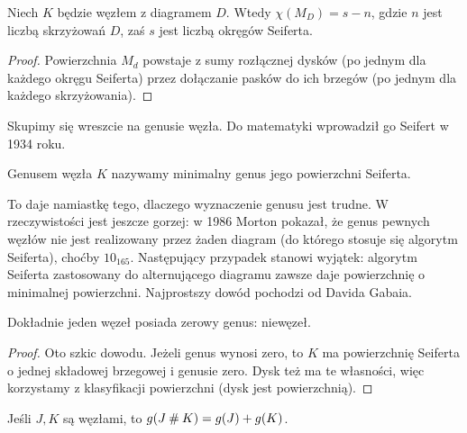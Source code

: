 
\begin{proposition}
    Niech $K$ będzie węzłem z diagramem $D$. Wtedy $\chi(M_D) = s - n$, gdzie $n$ jest liczbą skrzyżowań $D$, zaś $s$ jest liczbą okręgów Seiferta.
\end{proposition}

\begin{proof}
Powierzchnia $M_d$ powstaje z sumy rozłącznej dysków (po jednym dla każdego okręgu Seiferta) przez dołączanie pasków do ich brzegów (po jednym dla każdego skrzyżowania).
\end{proof}

Skupimy się wreszcie na genusie węzła.
Do matematyki wprowadził go Seifert w 1934 roku.

\begin{definition}
    Genusem węzła $K$ nazywamy minimalny genus jego powierzchni Seiferta.
\end{definition}

To daje namiastkę tego, dlaczego wyznaczenie genusu jest trudne.
W rzeczywistości jest jeszcze gorzej: w 1986 Morton pokazał, że genus pewnych węzłów nie jest realizowany przez żaden diagram (do którego stosuje się algorytm Seiferta), choćby $10_{165}$.
Następujący przypadek stanowi wyjątek: algorytm Seiferta zastosowany do alternującego diagramu zawsze daje powierzchnię o minimalnej powierzchni.
Najprostszy dowód pochodzi od Davida Gabaia.

\begin{proposition} \label{genus_one}
    Dokładnie jeden węzeł posiada zerowy genus: niewęzeł.
\end{proposition}

\begin{proof}Oto szkic dowodu.
Jeżeli genus wynosi zero, to $K$ ma powierzchnię Seiferta o jednej składowej brzegowej i genusie zero.
Dysk też ma te własności, więc korzystamy z klasyfikacji powierzchni (dysk jest powierzchnią).
\end{proof}

\begin{proposition} \label{genus_sum}
    Jeśli $J, K$ są węzłami, to $g (J \mathbin{\#} K) = g(J) + g(K)$.
\end{proposition}

